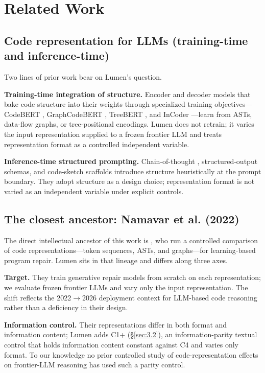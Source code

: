 \documentclass[11pt]{article}
\begin{document}
\section{Related Work}
\label{sec:2}

\subsection{Code representation for LLMs (training-time and inference-time)}
\label{sec:2.1}
Two lines of prior work bear on Lumen's question.

\textbf{Training-time integration of structure.} Encoder and
decoder models that bake code structure into their weights
through specialized training objectives---CodeBERT
\citep{feng2020codebert}, GraphCodeBERT \citep{guo2021graphcodebert},
TreeBERT \citep{jiang2021treebert}, and InCoder
\citep{fried2022incoder}---learn from ASTs, data-flow graphs, or
tree-positional encodings. Lumen does not retrain; it varies the
input representation supplied to a frozen frontier LLM and treats
representation format as a controlled independent variable.

\textbf{Inference-time structured prompting.} Chain-of-thought
\citep{wei2022cot}, structured-output schemas, and code-sketch
scaffolds introduce structure heuristically at the prompt
boundary. They adopt structure as a design choice; representation
format is not varied as an independent variable under explicit
controls.

\subsection{The closest ancestor: Namavar et al. (2022)}
\label{sec:2.2}
The direct intellectual ancestor of this work is
\citet{namavar2022coderepr}, who run a controlled comparison of
code representations---token sequences, ASTs, and graphs---for
learning-based program repair. Lumen sits in that lineage and
differs along three axes.

\textbf{Target.} They train generative repair models from scratch
on each representation; we evaluate frozen frontier LLMs and vary
only the input representation. The shift reflects the
2022$\to$2026 deployment context for LLM-based code reasoning
rather than a deficiency in their design.

\textbf{Information control.} Their representations differ in
both format and information content; Lumen adds C1+
(\S\ref{sec:3.2}), an information-parity textual control that
holds information content constant against C4 and varies only
format. To our knowledge no prior controlled study of
code-representation effects on frontier-LLM reasoning has used
such a parity control.
\end{document}
